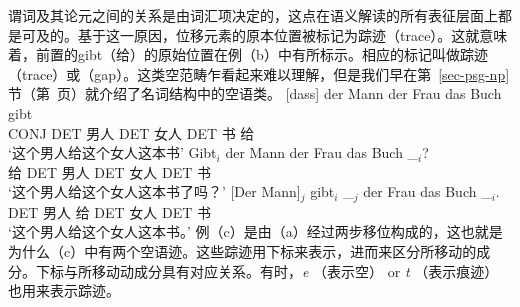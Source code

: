 谓词及其论元之间的关系是由词汇项决定的，这点在语义解读的所有表征层面上都是可及的。基于这一原因，位移元素的原本位置被标记为踪迹（trace）。这就意味着，前置的gibt（给）的原始位置在例（b）中有所标示。相应的标记叫做踪迹（trace）或（gap）。这类空范畴乍看起来难以理解，但是我们早在第~\ref{sec-psg-np} 节（第~\pageref{np-epsilon}页）就介绍了名词结构中的空语类。
\eal
\ex 
\gll {}[dass] der Mann der Frau das Buch gibt\\
	 {}\spacebr{}CONJ DET 男人 DET 女人 DET 书 给\\
\glt `这个男人给这个女人这本书'
\ex 
\gll Gibt$_i$ der Mann der Frau das Buch \_$_i$?\\
	 给 DET 男人 DET 女人 DET 书\\
\glt `这个男人给这个女人这本书了吗？'
\ex 
\gll {}[Der Mann]$_j$ gibt$_i$ \_$_j$ der Frau das Buch \_$_i$.\\
	 {}\spacebr{}DET 男人 给 {} DET 女人 DET 书\\
\glt `这个男人给这个女人这本书。'
\zl
例（c）是由（a）经过两步移位构成的，这也就是为什么（c）中有两个空语迹。这些踪迹用下标来表示，进而来区分所移动的成分。下标与所移动动成分具有对应关系。有时，\emph{e} （表示空） or \emph{t} （表示痕迹）也用来表示踪迹。

